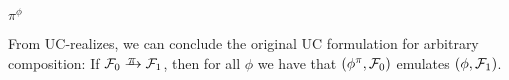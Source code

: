 \begin{definition}[Composition]
  $\pi^{\phi}$ \todo{}
\end{definition}

\begin{theorem}
  From UC-realizes, we can conclude the original UC formulation for arbitrary
  composition: If $\mc{F}_0 \yrightarrow{$\pi$} \mc{F}_1$, then for all $\phi$ we
  have that $(\phi^{\pi}, \mathcal{{F}}_0)$ emulates $(\phi, \mathcal{{F}}_1)$.
\end{theorem}

\begin{comment}
\subsection{Brain Dump}

\begin{definition}[Protocol Emulation]
Let $\pi$ and $\phi$ be probabilistic polynomial time (p.p.t) protocols. We say
that $\pi$ UC-emulates $\phi$ if for any p.p.t. adversary $\mc{A}$ there exists a
p.p.t. ideal-process adversary $\mc{S}$ such that for any balanced PPT environment
$\mc{Z}$ we have:
\begin{equation*}
\textsc{Exec}_{\phi, \mc{S}, \mc{Z}} \approx \textsc{Exec}_{\pi, \mc{A}, \mc{Z}}.
\end{equation*}
\end{definition}

\begin{lemma}[Protocol Emulation w.r.t. the Dummy Adversary]
Let $\pi$ and $\phi$ be probabilistic polynomial time (p.p.t) protocols. We say
that $\pi$ UC-emulates $\phi$ if for the dummy adversary $\mc{D}$ there exists a
p.p.t. ideal-process adversary $\mc{S}$ such that for any balanced PPT environment
$\mc{Z}$ we have:
\begin{equation*}
\textsc{Exec}_{\phi, \mc{S}, \mc{Z}} \approx \textsc{Exec}_{\pi, \mc{D}, \mc{Z}}.
\end{equation*}
\end{lemma}

\begin{theorem}[Universal Composition]
  Let $\rho$, $\pi$, and $\phi$, be p.p.t protocols such that $\pi$ UC-emulates $\phi$ and
  both $\phi$ and $\pi$ are subroutine respecting. Then protocol $\rho^{\phi -> \pi}$
  UC-emulates protocol $\rho$.
\end{theorem}

\begin{corollary}
  Let $\rho$, $\pi$ be p.p.t protocols such that $\pi$ UC-realizes a p.p.t ideal
  functionality $\mc{F}$, and both $\rho$ and $\pi$ are subroutine respecting. Then
  protocol $\rho^{\pi/\mc{F}}$ UC-emulates protocol $\rho$.
\end{corollary}


\end{comment}
